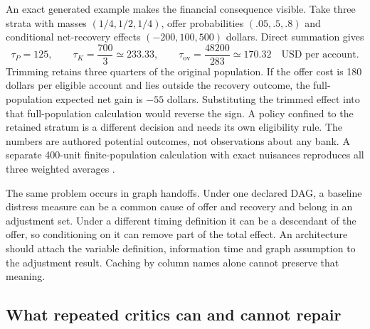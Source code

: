 An exact generated example makes the financial consequence visible. Take
three strata with masses $(1/4,1/2,1/4)$, offer probabilities
$(.05,.5,.8)$ and conditional net-recovery effects $(-200,100,500)$ dollars.
Direct summation gives
\begin{equation}
 \tau_P=125,\qquad
 \tau_K=\frac{700}{3}\simeq233.33,\qquad
 \tau_{\mathrm{ov}}=\frac{48200}{283}\simeq170.32
 \quad\text{USD per account}.
 \label{exec13:architecture-target-numbers}
\end{equation}
Trimming retains three quarters of the original population. If the offer
cost is 180 dollars per eligible account and lies outside the recovery
outcome, the full-population expected net gain is $-55$ dollars. Substituting
the trimmed effect into that full-population calculation would reverse the
sign. A policy confined to the retained stratum is a different decision and
needs its own eligibility rule. The numbers are authored potential outcomes,
not observations about any bank. A separate 400-unit finite-population
calculation with exact nuisances reproduces all three weighted averages
\cite{exec13_architecture_exact}.

The same problem occurs in graph handoffs. Under one declared DAG, a baseline
distress measure can be a common cause of offer and recovery and belong in an
adjustment set. Under a different timing definition it can be a descendant of
the offer, so conditioning on it can remove part of the total effect. An
architecture should attach the variable definition, information time and graph
assumption to the adjustment result. Caching by column names alone cannot
preserve that meaning.

\subsection{What repeated critics can and cannot repair}

